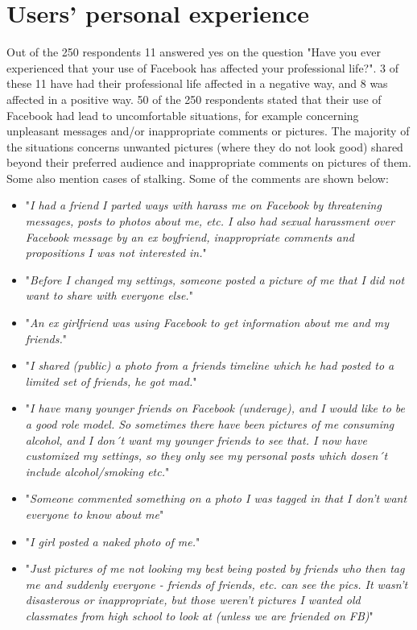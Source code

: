 \section{Users' personal experience}
Out of the 250 respondents 11 answered yes on the question "Have you ever experienced that your use of Facebook has affected your professional life?". 3 of these 11 have had their professional life affected in a negative way, and 8 was affected in a positive way. 
50 of the 250 respondents stated that their use of Facebook had lead to uncomfortable situations, for example concerning unpleasant messages and/or inappropriate comments or pictures. The majority of the situations concerns unwanted pictures (where they do not look good) shared beyond their preferred audience and inappropriate comments on pictures of them. Some also mention cases of stalking. Some of the comments are shown below:

\begin{itemize} 
\item "\textit{I had a friend I parted ways with harass me on Facebook by threatening messages, posts to photos about me, etc. I also had sexual harassment over Facebook message by an ex boyfriend, inappropriate comments and propositions I was not interested in.}"
\item "\textit{Before I changed my settings, someone posted a picture of me that I did not want to share with everyone else.}"
\item "\textit{An ex girlfriend was using Facebook to get information about me and my friends.}"
\item "\textit{I shared (public) a photo from a friends timeline which he had posted to a limited set of friends, he got mad.}"
\item "\textit{I have many younger friends on Facebook (underage), and I would like to be a good role model. So sometimes there have been pictures of me consuming alcohol, and I don´t want my younger friends to see that. I now have customized my settings, so they only see my personal posts which dosen´t include alcohol/smoking etc.}"
\item "\textit{Someone commented something on a photo I was tagged in that I don't want everyone to know about me}"
\item "\textit{I girl posted a naked photo of me.}"
\item "\textit{Just pictures of me not looking my best being posted by friends who then tag me and suddenly everyone - friends of friends, etc. can see the pics. It wasn't disasterous or inappropriate, but those weren't pictures I wanted old classmates from high school to look at (unless we are friended on FB)}"
\end{itemize}

